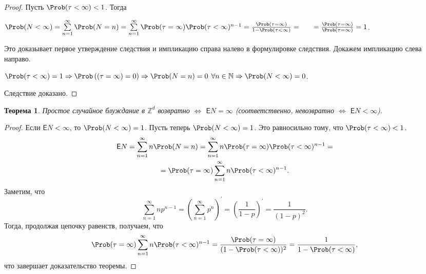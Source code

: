 \documentclass[a4paper]{article}
\newcommand{\Expect}{\mathsf{E}}
\theoremstyle{plain}
\newtheorem{thm}{Теорема}[section]
\theoremstyle{definition}
\theoremstyle{remark}
\begin{document}
\begin{proof}
  Пусть $\Prob(\tau < \infty) < 1$. Тогда
  \begin{flushleft}
    $\Prob(N < \infty) = \sum\limits_{n=1}^{\infty} \Prob(N = n) = \sum\limits_{n=1}^{\infty} \Prob(\tau = \infty) \Prob(\tau < \infty)^{n-1} = \frac{\Prob(\tau = \infty)}{1 - \Prob(\tau < \infty)} = \qquad = \frac{\Prob(\tau = \infty)}{\Prob(\tau = \infty)} = 1$.
  \end{flushleft}
  Это доказывает первое утверждение следствия и импликацию справа налево в формулировке следствия. Докажем импликацию слева направо.
  \begin{flushleft}
    $\Prob(\tau < \infty) = 1 \Rightarrow \Prob \left((\tau = \infty ) = 0 \right) \Rightarrow \Prob(N = n) = 0$ $\forall n \in \mathbb{N} \Rightarrow \Prob(N < \infty) = 0$.
  \end{flushleft}
  Следствие доказано.
\end{proof}

\begin{thm}
  Простое случайное блуждание в $\mathbb{Z}^{d}$ возвратно $\Leftrightarrow$ $\Expect N = \infty$ (соответственно, невозвратно $\Leftrightarrow$ $\Expect N < \infty$).
\end{thm}

\begin{proof}
  Если $\Expect N < \infty$, то $\Prob(N<\infty) = 1$.
  Пусть теперь $\Prob(N<\infty) = 1$. Это равносильно тому, что $\Prob(\tau < \infty) < 1$.
  \begin{multline*}
    \Expect N = \sum\limits_{n=1}^{\infty} n\Prob(N=n) = \sum\limits_{n=1}^{\infty} n\Prob(\tau = \infty)\Prob(\tau < \infty)^{n-1} = \\ =\Prob(\tau = \infty)\sum\limits_{n=1}^{\infty} n\Prob(\tau < \infty)^{n-1}.
  \end{multline*}
  Заметим, что
  \begin{equation*}
    \sum\limits_{n=1}^{\infty} np^{n-1} = (\sum\limits_{n=1}^{\infty} p^{n})^{\prime} = (\frac{1}{1-p})^{\prime} = \frac{1}{(1-p)^{2}}.
  \end{equation*}
  Тогда, продолжая цепочку равенств, получаем, что
  \begin{equation*}
    \Prob(\tau = \infty)\sum\limits_{n=1}^{\infty} n\Prob(\tau < \infty)^{n-1} = \frac{\Prob(\tau = \infty)}{(1 - \Prob(\tau < \infty))^{2}} = \frac{1}{1 - \Prob(\tau < \infty)},
  \end{equation*}
  что завершает доказательство теоремы.
\end{proof}
\end{document}
